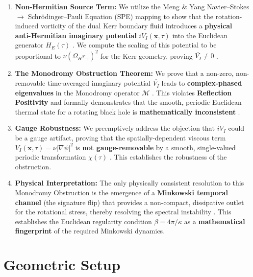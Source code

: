 \documentclass[11pt]{article}
\begin{document}
\begin{enumerate}
    \item \textbf{Non-Hermitian Source Term:} We utilize the Meng \& Yang Navier–Stokes $\to$ Schrödinger–Pauli Equation (SPE) mapping \cite{MengYang2024} to show that the rotation-induced vorticity of the dual Kerr boundary fluid introduces a \textbf{physical anti-Hermitian imaginary potential} $iV_I(\mathbf{x}, \tau)$ into the Euclidean generator $H_E(\tau)$ \cite{Explicit VI and Kerr scaling.txt}. We compute the scaling of this potential to be proportional to $\nu(\Omega_H r_+)^2$ for the Kerr geometry, proving $\overline{V_I} \neq 0$ \cite{Explicit VI and Kerr scaling.txt, appendix_a2_vorticity_calculation.tex}.

    \item \textbf{The Monodromy Obstruction Theorem:} We prove that a non-zero, non-removable time-averaged imaginary potential $\overline{V_I}$ leads to \textbf{complex-phased eigenvalues} in the Monodromy operator $\mathcal{M}$ \cite{Monodromy obstruction subsection.txt}. This violates \textbf{Reflection Positivity} and formally demonstrates that the smooth, periodic Euclidean thermal state for a rotating black hole is \textbf{mathematically inconsistent} \cite{Monodromy obstruction subsection.txt}.

    \item \textbf{Gauge Robustness:} We preemptively address the objection that $iV_I$ could be a gauge artifact, proving that the spatially-dependent viscous term $V_I(\mathbf{x}, \tau) = \nu|\nabla\psi|^2$ is \textbf{not gauge-removable} by a smooth, single-valued periodic transformation $\chi(\tau)$ \cite{Gauge-removability lemma.txt}. This establishes the robustness of the obstruction.

    \item \textbf{Physical Interpretation:} The only physically consistent resolution to this Monodromy Obstruction is the emergence of a \textbf{Minkowski temporal channel} (the signature flip) that provides a non-compact, dissipative outlet for the rotational stress, thereby resolving the spectral instability \cite{appendix_a3_ns_spinor_mapping.tex}. This establishes the Euclidean regularity condition $\beta = 4\pi/\kappa$ \cite{GibbonsHawking1977} as a \textbf{mathematical fingerprint} of the required Minkowski dynamics.
\end{enumerate}

\section{Geometric Setup}
\end{document}
